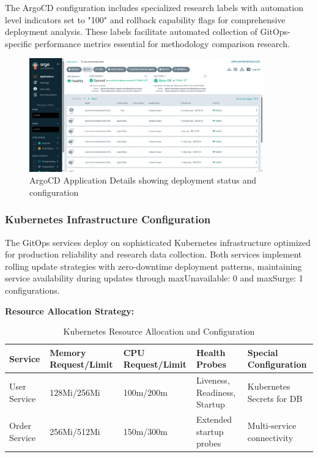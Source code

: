 The ArgoCD configuration includes specialized research labels with automation level indicators set to "100" and rollback capability flags for comprehensive deployment analysis. These labels facilitate automated collection of GitOps-specific performance metrics essential for methodology comparison research.

\begin{figure}[H]
\centering
\includegraphics[width=0.9\textwidth]{figures/chapter4/argocd-application-details.png}
\caption{ArgoCD Application Details showing deployment status and configuration}
\label{fig:argocd-application-details}
\end{figure}

\subsubsection{Kubernetes Infrastructure Configuration}

The GitOps services deploy on sophisticated Kubernetes infrastructure optimized for production reliability and research data collection. Both services implement rolling update strategies with zero-downtime deployment patterns, maintaining service availability during updates through maxUnavailable: 0 and maxSurge: 1 configurations.

\textbf{Resource Allocation Strategy:}

\begin{table}[H]
\centering
\caption{Kubernetes Resource Allocation and Configuration}
\label{tab:kubernetes-resource-allocation}
\begin{tabular}{|p{3cm}|p{2.5cm}|p{2.5cm}|p{3cm}|p{3cm}|}
\hline
\textbf{Service} & \textbf{Memory Request/Limit} & \textbf{CPU Request/Limit} & \textbf{Health Probes} & \textbf{Special Configuration} \\
\hline
User Service & 128Mi/256Mi & 100m/200m & Liveness, Readiness, Startup & Kubernetes Secrets for DB \\
\hline
Order Service & 256Mi/512Mi & 150m/300m & Extended startup probes & Multi-service connectivity \\
\hline
\end{tabular}
\end{table}

